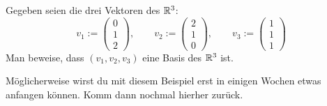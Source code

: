 \begin{aufg}
    Gegeben seien die drei Vektoren des $\mathbb R^3$:
        \[ v_1:= \begin{pmatrix} 0 \\ 1 \\ 2 \end{pmatrix},\qquad  v_2:= \begin{pmatrix} 2 \\ 1 \\ 0 \end{pmatrix},\qquad v_3:= \begin{pmatrix} 1 \\ 1 \\ 1 \end{pmatrix}\]
    Man beweise, dass $(v_1,v_2,v_3)$ eine Basis des $\mathbb R^3$ ist.
\end{aufg}


Möglicherweise wirst du mit diesem Beispiel erst in einigen Wochen etwas anfangen können. Komm dann nochmal hierher zurück.


